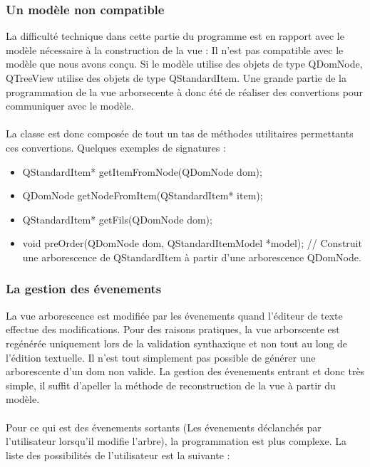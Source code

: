 \subsubsection{Un modèle non compatible}


La difficulté technique dans cette partie du programme est en rapport avec le modèle nécessaire à la construction de la vue :
Il n'est pas compatible avec le modèle que nous avons conçu. Si le modèle utilise des objets de type QDomNode, QTreeView utilise des objets de type QStandardItem. Une grande partie de la programmation de la vue arborsecente à donc été de réaliser des convertions pour communiquer avec le modèle.
\paragraph{}

La classe est donc composée de tout un tas de méthodes utilitaires permettants ces convertions. Quelques exemples de signatures :
\begin{itemize}
\item QStandardItem* getItemFromNode(QDomNode dom);
\item QDomNode getNodeFromItem(QStandardItem* item);
\item QStandardItem* getFils(QDomNode dom);
\item void preOrder(QDomNode dom, QStandardItemModel *model); // Construit une arborescence de QStandardItem à partir d'une arborescence QDomNode.
\end{itemize}


\subsubsection{La gestion des évenements}

La vue arborescence est modifiée par les évenements quand l'éditeur de texte effectue des modifications.
Pour des raisons pratiques, la vue arborscente est regénérée uniquement lors de la validation synthaxique et non tout au long de
l'édition textuelle. Il n'est tout simplement pas possible de générer une arborescente d'un dom non valide.
La gestion des évenements entrant et donc très simple, il suffit d'apeller la méthode de reconstruction de la vue à partir du modèle.
\paragraph{}

Pour ce qui est des évenements sortants (Les évenements déclanchés par l'utilisateur lorsqu'il modifie l'arbre), la programmation
est plus complexe. La liste des possibilités de l'utilisateur est la suivante :

